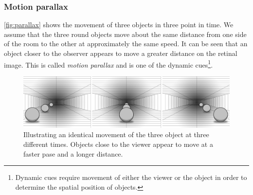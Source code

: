 \subsubsection{Motion parallax}\label{sec:parallax}
\autoref{fig:parallax} shows the movement of three objects in three point in time. We assume that the three round objects move about the same distance from one side of the room to the other at approximately the same speed. It can be seen that an object closer to the observer appears to move a greater distance on the retinal image. This is called \textit{motion parallax} and is one of the dynamic cues\footnote{Dynamic cues require movement of either the viewer or the object in order to determine the spatial position of objects\citep{sensationPerception}.}\citep[p.~204]{sensationPerception}.
\begin{figure}[H]
	\centering
	\includegraphics[width=1\linewidth]{figure/Analysis/parallax.png}
	\caption{Illustrating an identical movement of the three object at three different times. Objects close to the viewer appear to move at a faster pase and a longer distance.}
	\label{fig:parallax}
\end{figure}

